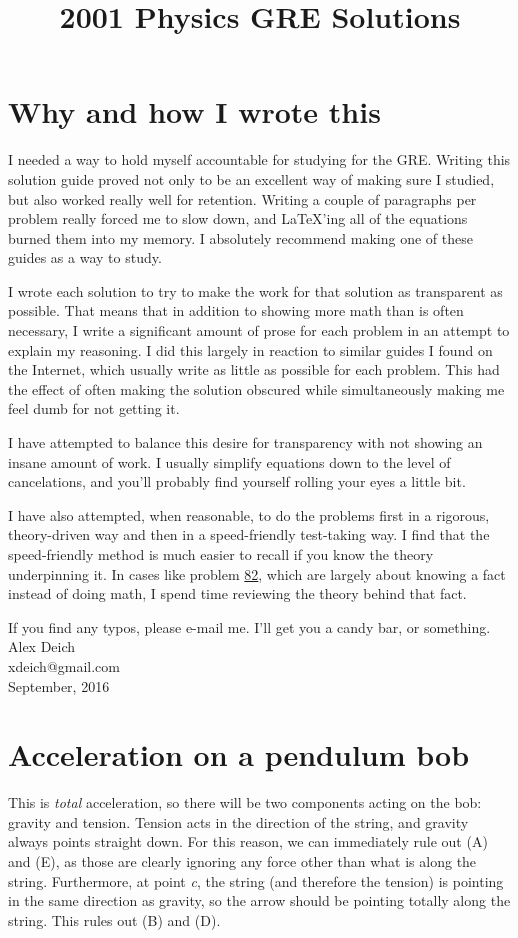 \documentclass[11pt]{paper}
\title{2001 Physics GRE Solutions}
\begin{document}
\maketitle
\newpage
\section*{Why and how I wrote this}
I needed a way to hold myself accountable for studying for the GRE.  Writing this solution guide proved not only to be an excellent way of making sure I studied, but also worked really well for retention.  Writing a couple of paragraphs per problem really forced me to slow down, and \LaTeX'ing all of the equations burned them into my memory.  I absolutely recommend making one of these guides as a way to study.

I wrote each solution to try to make the work for that solution as transparent as possible.  That means that in addition to showing more math than is often necessary, I write a significant amount of prose for each problem in an attempt to explain my reasoning.  I did this largely in reaction to similar guides I found on the Internet, which usually write as little as possible for each problem.  This had the effect of often making the solution obscured while simultaneously making me feel dumb for not getting it.

I have attempted to balance this desire for transparency with not showing an insane amount of work.  I usually simplify equations down to the level of cancelations, and you'll probably find yourself rolling your eyes a little bit.

I have also attempted, when reasonable, to do the problems first in a rigorous, theory-driven way and then in a speed-friendly test-taking way.  I find that the speed-friendly method is much easier to recall if you know the theory underpinning it.  In cases like problem \hyperlink{section.82}{82}, which are largely about knowing a fact instead of doing math, I spend time reviewing the theory behind that fact.

If you find any typos, please e-mail me.  I'll get you a candy bar, or something.\\

Alex Deich\\
\phantom{.}\hspace{10pt} xdeich@gmail.com\\
\phantom{.}\hspace{10pt} September, 2016
\newpage
\tableofcontents
\newpage
\section{Acceleration on a pendulum bob}
This is \emph{total} acceleration, so there will be two components acting on the bob: gravity and tension.  Tension acts in the direction of the string, and gravity always points straight down.  For this reason, we can immediately rule out (A) and (E), as those are clearly ignoring any force other than what is along the string.  Furthermore, at point \emph{c}, the string (and therefore the tension) is pointing in the same direction as gravity, so the arrow should be pointing totally along the string.  This rules out (B) and (D).\\
\end{document}
